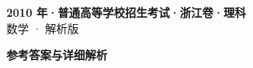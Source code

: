 \documentclass[zihao=-4, a4paper]{ctexart}
\begin{document}
\begin{center}
  {\Large\bfseries 2010 年·普通高等学校招生考试·浙江卷·理科}\\[4pt]
  {\large 数学 · 解析版}
\end{center}
\medskip
{}

\clearpage
{}
\begin{center}{\Large\bfseries 参考答案与详细解析}\end{center}
\medskip

\end{document}
